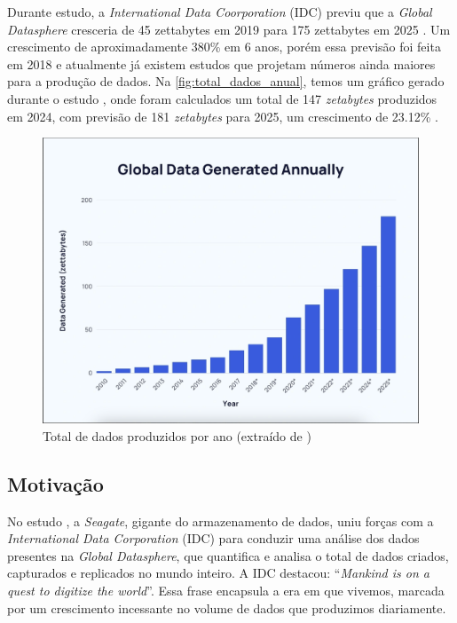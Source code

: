 \documentclass[a4paper, 12pt]{article}
\newcommand{\citeb}[1]{\bibleftbracket\cite{#1}\bibrightbracket}
\begin{document}
    Durante estudo, a \textit{International Data Coorporation} (IDC) previu que a \textit{Global Datasphere} cresceria de 45 zettabytes em 2019 para 175 zettabytes em 2025 \citeb{digitization}. Um crescimento de aproximadamente 380\% em 6 anos, porém essa previsão foi feita em 2018 e atualmente já existem estudos que projetam números ainda maiores para a produção de dados. Na \autoref{fig:total_dados_anual}, temos um gráfico gerado durante o estudo , onde foram calculados um total de 147 \textit{zetabytes} produzidos em 2024, com previsão de 181 \textit{zetabytes} para 2025, um crescimento de 23.12\% \citeb{data_created}.

    \begin{figure}[ht]
        \includegraphics[width=\textwidth,height=0.9\textheight,keepaspectratio]{global-data-generated-annually-fabio-duarte.png}
        \centering
        \caption{Total de dados produzidos por ano (extraído de \citeb{data_created})}
        \centering
        \label{fig:total_dados_anual}
    \end{figure}        

    \subsection{Motivação}

    No estudo , a \textit{Seagate}, gigante do armazenamento de dados, uniu forças com a \textit{International Data Corporation} (IDC) para conduzir uma análise dos dados presentes na \textit{Global Datasphere}, que quantifica e analisa o total de dados criados, capturados e replicados no mundo inteiro. A IDC destacou: ``\textit{Mankind is on a quest to digitize the world}''. Essa frase encapsula a era em que vivemos, marcada por um crescimento incessante no volume de dados que produzimos diariamente.
    
\end{document}
